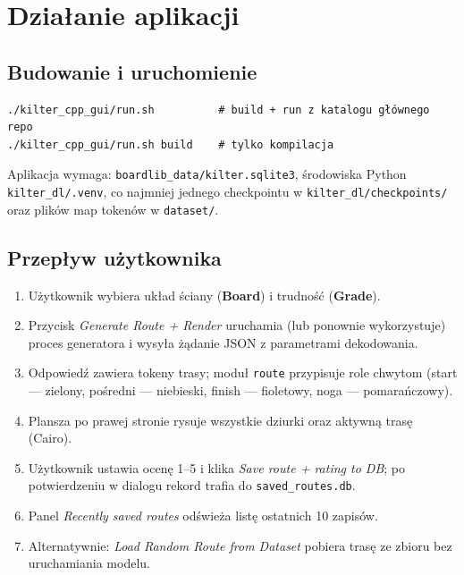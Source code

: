 \documentclass[fleqn,onecolumn,a4paper,12pt,titlepage]{article}
\begin{document}
\newpage

\section*{Działanie aplikacji}

\subsection*{Budowanie i uruchomienie}

\begin{verbatim}
./kilter_cpp_gui/run.sh          # build + run z katalogu głównego repo
./kilter_cpp_gui/run.sh build    # tylko kompilacja
\end{verbatim}

Aplikacja wymaga: \texttt{boardlib\_data/kilter.sqlite3}, środowiska Python
\texttt{kilter\_dl/.venv}, co najmniej jednego checkpointu w \texttt{kilter\_dl/checkpoints/}
oraz plików map tokenów w \texttt{dataset/}.

\subsection*{Przepływ użytkownika}

\begin{enumerate}[leftmargin=1.5em]
    \item Użytkownik wybiera układ ściany (\textbf{Board}) i trudność (\textbf{Grade}).
    \item Przycisk \emph{Generate Route + Render} uruchamia (lub ponownie wykorzystuje)
          proces generatora i wysyła żądanie JSON z parametrami dekodowania.
    \item Odpowiedź zawiera tokeny trasy; moduł \texttt{route} przypisuje role chwytom
          (start --- zielony, pośredni --- niebieski, finish --- fioletowy, noga --- pomarańczowy).
    \item Plansza po prawej stronie rysuje wszystkie dziurki oraz aktywną trasę (Cairo).
    \item Użytkownik ustawia ocenę 1--5 i klika \emph{Save route + rating to DB};
          po potwierdzeniu w dialogu rekord trafia do \texttt{saved\_routes.db}.
    \item Panel \emph{Recently saved routes} odświeża listę ostatnich 10 zapisów.
    \item Alternatywnie: \emph{Load Random Route from Dataset} pobiera trasę ze zbioru
          bez uruchamiania modelu.
\end{enumerate}
\end{document}
